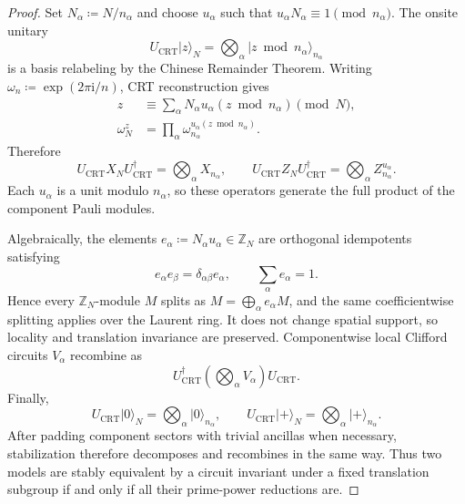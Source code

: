 \documentclass[aps,prx,english,superscriptaddress,twocolumn,tightenlines,showpacs,longbibliography,floatfix,amsfonts]{revtex4-2}
\theoremstyle{remark}
\theoremstyle{definition}
\begin{document}
\begin{proof}
	Set $N_\alpha\coloneqq N/n_\alpha$ and choose $u_\alpha$ such that
	$u_\alpha N_\alpha\equiv1\pmod{n_\alpha}$. The onsite unitary
	\begin{equation}
		U_{\mathrm{CRT}}\lvert z\rangle_N
		=
		\bigotimes_\alpha
		\lvert z\bmod n_\alpha\rangle_{n_\alpha}
		\label{eq:onsite-crt-unitary}
	\end{equation}
	is a basis relabeling by the Chinese Remainder Theorem. Writing
	$\omega_n\coloneqq\exp(2\pi\mathrm{i}/n)$, CRT reconstruction gives
	\begin{equation}
		\begin{aligned}
			z
			&\equiv
			\sum_\alpha N_\alpha u_\alpha(z\bmod n_\alpha)
			\pmod N,\\
			\omega_N^z
			&=
			\prod_\alpha
			\omega_{n_\alpha}^{u_\alpha(z\bmod n_\alpha)}.
		\end{aligned}
	\end{equation}
	Therefore
	\begin{equation}
		U_{\mathrm{CRT}}X_NU_{\mathrm{CRT}}^\dagger
		=
		\bigotimes_\alpha X_{n_\alpha},
		\qquad
		U_{\mathrm{CRT}}Z_NU_{\mathrm{CRT}}^\dagger
		=
		\bigotimes_\alpha Z_{n_\alpha}^{u_\alpha}.
		\label{eq:crt-pauli-factorization}
	\end{equation}
	Each $u_\alpha$ is a unit modulo $n_\alpha$, so these operators generate
	the full product of the component Pauli modules.

	Algebraically, the elements
	$e_\alpha\coloneqq N_\alpha u_\alpha\in\mathbb Z_N$ are orthogonal
	idempotents satisfying
	\begin{equation}
		e_\alpha e_\beta
		=
		\delta_{\alpha\beta}e_\alpha,
		\qquad
		\sum_\alpha e_\alpha=1.
	\end{equation}
	Hence every $\mathbb Z_N$-module $M$ splits as
	$M=\bigoplus_\alpha e_\alpha M$, and the same coefficientwise splitting
	applies over the Laurent ring. It does not change spatial support, so
	locality and translation invariance are preserved. Componentwise local
	Clifford circuits $V_\alpha$ recombine as
	\begin{equation}
		U_{\mathrm{CRT}}^\dagger
		\left(\bigotimes_\alpha V_\alpha\right)
		U_{\mathrm{CRT}}.
	\end{equation}
	Finally,
	\begin{equation}
		U_{\mathrm{CRT}}\lvert0\rangle_N
		=
		\bigotimes_\alpha\lvert0\rangle_{n_\alpha},
		\qquad
		U_{\mathrm{CRT}}\lvert+\rangle_N
		=
		\bigotimes_\alpha\lvert+\rangle_{n_\alpha}.
	\end{equation}
	After padding component sectors with trivial ancillas when necessary,
	stabilization therefore decomposes and recombines in the same way. Thus two
	models are stably equivalent by a circuit invariant under a fixed
	translation subgroup if and only if all their prime-power reductions are.
\end{proof}
\end{document}
